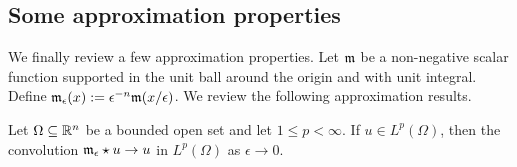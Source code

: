\documentclass[10pt,letterpaper]{article}
\newcommand\cye[1]{%
  \protect\leavevmode
  \begingroup
    \color{red!35!yellow}%
    #1%
  \endgroup
}
\begin{document}
\subsection{\cye{Some approximation properties}}

We \cye{finally} review a few approximation properties. 
Let ${\mathfrak m}$ be a non-negative scalar function supported in the unit ball around the origin and with unit integral.
Define ${\mathfrak m}_{\epsilon}(x) := \epsilon^{-n} {\mathfrak m}(x/\epsilon)$. We review the following approximation results.

\begin{lemma}
    Let $\Omega \subseteq {\mathbb R}^{n}$ be a bounded open set and let $1 \leq p < \infty$. 
    If $u \in L^{p}(\Omega)$, then \cye{the convolution} ${\mathfrak m}_{\epsilon} \star u \rightarrow u$ in $L^{p}(\Omega)$ as $\epsilon \rightarrow 0$.
\end{lemma}

\end{document}
